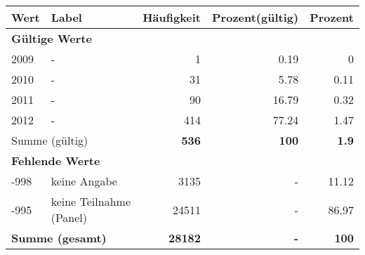     \begin{longtable}{lXrrr}
     \toprule
     \textbf{Wert} & \textbf{Label} & \textbf{Häufigkeit} & \textbf{Prozent(gültig)} & \textbf{Prozent} \\
     \endhead
     \midrule
     \multicolumn{5}{l}{\textbf{Gültige Werte}}\\

     2009 &
     \multicolumn{1}{X}{ -  } &


       \num{1} &
       \num[round-mode=places,round-precision=2]{0.19} &
         \num[round-mode=places,round-precision=2]{0} \\

     2010 &
     \multicolumn{1}{X}{ -  } &


       \num{31} &
       \num[round-mode=places,round-precision=2]{5.78} &
         \num[round-mode=places,round-precision=2]{0.11} \\

     2011 &
     \multicolumn{1}{X}{ -  } &


       \num{90} &
       \num[round-mode=places,round-precision=2]{16.79} &
         \num[round-mode=places,round-precision=2]{0.32} \\

     2012 &
     \multicolumn{1}{X}{ -  } &


       \num{414} &
       \num[round-mode=places,round-precision=2]{77.24} &
         \num[round-mode=places,round-precision=2]{1.47} \\
     \midrule
     \multicolumn{2}{l}{Summe (gültig)} &
       \textbf{\num{536}} &
     \textbf{100} &
       \textbf{\num[round-mode=places,round-precision=2]{1.9}} \\
     \multicolumn{5}{l}{\textbf{Fehlende Werte}}\\
       -998 &
       keine Angabe &
         \num{3135} &
        - &
         \num[round-mode=places,round-precision=2]{11.12} \\
       -995 &
       keine Teilnahme (Panel) &
         \num{24511} &
        - &
         \num[round-mode=places,round-precision=2]{86.97} \\
     \midrule
     \multicolumn{2}{l}{\textbf{Summe (gesamt)}} &
          \textbf{\num{28182}} &
        \textbf{-} &
        \textbf{100} \\
     \bottomrule
     \end{longtable}
     
